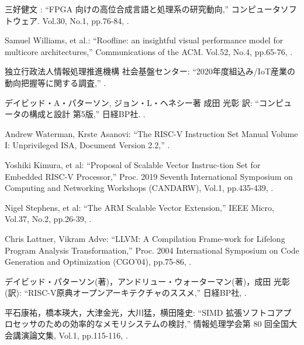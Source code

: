 {\small 三好健文 : %
\newblock ``FPGA 向けの高位合成言語と処理系の研究動向,''
\newblock コンピュータソフトウェア. 
\newblock Vol.30,
\newblock No.1,
\newblock pp.76-84,
.}

{\small Samuel Williams, et al.: %
\newblock ``Roofline: an insightful visual performance model for multicore architectures,''
\newblock Communications of the ACM. 
\newblock Vol.52,
\newblock No.4,
\newblock pp.65-76,
.}

{\small 独立行政法人情報処理推進機構 社会基盤センター: %
\newblock ``2020年度組込み/IoT産業の動向把握等に関する調査,''
.}

{\small デイビッド・A・パターソン, ジョン・L・ヘネシー著 成田 光彰 訳: %
\newblock ``コンピュータの構成と設計 第5版,''
\newblock 日経BP社. 
.}

{\small Andrew Waterman, Krste Asanovi: %
\newblock ``The RISC-V Instruction Set Manual Volume I: Unprivileged ISA, Document Version 2.2,''
.}

{\small Yoshiki Kimura, et al:      %
\newblock ``Proposal of Scalable Vector Instruc-tion Set for Embedded RISC-V Processor,''
\newblock Proc. 2019 Seventh International Symposium on Computing and Networking Workshops (CANDARW),
\newblock Vol.1,
\newblock pp.435-439,
.}

{\small Nigel Stephens, et al:      %
\newblock ``The ARM Scalable Vector Extension,''
\newblock IEEE Micro,
\newblock Vol.37,
\newblock No.2,
\newblock pp.26-39,
.}

{\small Chris Lattner, Vikram Adve:      %
\newblock ``LLVM: A Compilation Frame-work for Lifelong Program Analysis Transformation,''
\newblock Proc. 2004 International Symposium on Code Generation and Optimization (CGO’04),
\newblock pp.75-86,
.}

{\small デイビッド・パターソン(著)，アンドリュー・ウォーターマン(著)，成田 光彰(訳):      %
\newblock ``RISC-V原典オープンアーキテクチャのススメ,''
\newblock 日経BP社,
.}

{\small 平石康祐，橋本瑛大，大津金光，大川猛，横田隆史:      %
\newblock ``SIMD 拡張ソフトコアプロセッサのための効率的なメモリシステムの検討,''
\newblock 情報処理学会第 80 回全国大会講演論文集,
\newblock Vol.1,
\newblock pp.115-116,
.}
